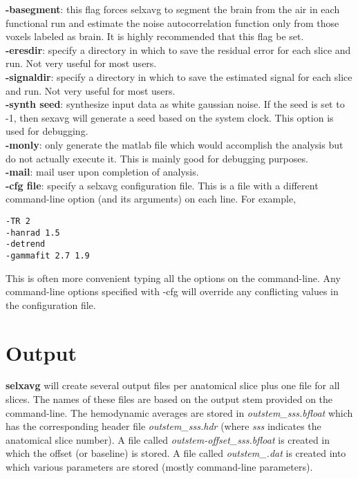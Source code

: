\documentclass[10pt]{article}
\begin{document}
\noindent
{\bf -basegment}: this flag forces selxavg to segment the brain from
the air in each functional run and estimate the noise autocorrelation
function only from those voxels labeled as brain.  It is highly
recommended that this flag be set.\\

\noindent
{\bf -eresdir}: specify a directory in which to save the residual
error for each slice and run.  Not very useful for most users.\\

\noindent
{\bf -signaldir}: specify a directory in which to save the estimated
signal for each slice and run. Not very useful for most users.\\

\noindent
{\bf -synth seed}: synthesize input data as white gaussian noise.  If
the seed is set to -1, then sexavg will generate a seed based on the
system clock.  This option is used for debugging.\\

\noindent
{\bf -monly}: only generate the matlab file which would accomplish the
analysis but do not actually execute it.  This is mainly good for
debugging purposes.\\

\noindent
{\bf -mail}: mail user upon completion of analysis.\\

\noindent
{\bf -cfg file}: specify a selxavg configuration file.  This is a file
with a different command-line option (and its arguments) on each line.
For example,
\begin{verbatim}
-TR 2
-hanrad 1.5
-detrend
-gammafit 2.7 1.9
\end{verbatim}
This is often more convenient typing all the options on the
command-line. Any command-line options specified with -cfg will
override any conflicting values in the configuration file.


\section{Output}

{\bf selxavg} will create several output files per anatomical slice
plus one file for all slices.  The names of these files are based on
the output stem provided on the command-line.  The hemodynamic
averages are stored in {\em outstem\_sss.bfloat} which has the
corresponding header file {\em outstem\_sss.hdr} (where {\em sss}
indicates the anatomical slice number).  A file called {\em
outstem-offset\_sss.bfloat} is created in which the offset (or
baseline) is stored. A file called {\em outstem\_.dat} is created into
which various parameters are stored (mostly command-line parameters).
\end{document}
